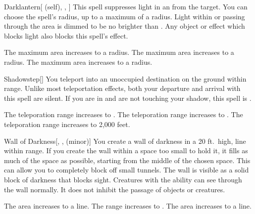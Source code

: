 \lowercase{\hypertarget{spell:Darklantern}{}}\label{spell:Darklantern}
\begin{attuneability}[Rank 1]{\hypertarget{spell:Darklantern}{Darklantern}}[ (self), , ]
This spell suppresses light in an  from the target.
You can choose the spell's radius, up to a maximum of a \areamed radius.
Light within or passing through the area is dimmed to be no brighter than .
Any object or effect which blocks light also blocks this spell's effect.

\rankline
{} The maximum area increases to a \arealarge radius.
 The maximum area increases to a \areahuge radius.
 The maximum area increases to a \areaext radius.

\end{attuneability}
\vspace{0.25em}



\lowercase{\hypertarget{spell:Shadowstep}{}}\label{spell:Shadowstep}
\begin{freeability}[Rank 1]{\hypertarget{spell:Shadowstep}{Shadowstep}}[]
You teleport into an unoccupied destination on the ground within \rngmed range.
Unlike most teleportation effects, both your departure and arrival with this spell are silent.
If you are in  and are not touching your shadow, this spell is .

\rankline
{} The teleporation range increases to \rnglong.
 The teleporation range increases to \rngext.
 The teleporation range increases to 2,000 feet.

\end{freeability}
\vspace{0.25em}



\lowercase{\hypertarget{spell:Wall of Darkness}{}}\label{spell:Wall of Darkness}
\begin{freeability}[Rank 1]{\hypertarget{spell:Wall of Darkness}{Wall of Darkness}}[, ,  (minor)]
\targetrule
You create a wall of darkness in a 20 ft.\ high, \areamed line within \rngmed range.
If you create the wall within a space too small to hold it, it fills as much of the space as possible, starting from the middle of the chosen space.
This can allow you to completely block off small tunnels.
The wall is visible as a solid block of darkness that blocks sight.
Creatures with the  ability can see through the wall normally.
It does not inhibit the passage of objects or creatures.

\rankline
{} The area increases to a \arealarge line.
 The range increases to \rnglong.
 The area increases to a \areahuge line.

\end{freeability}
\vspace{0.25em}



